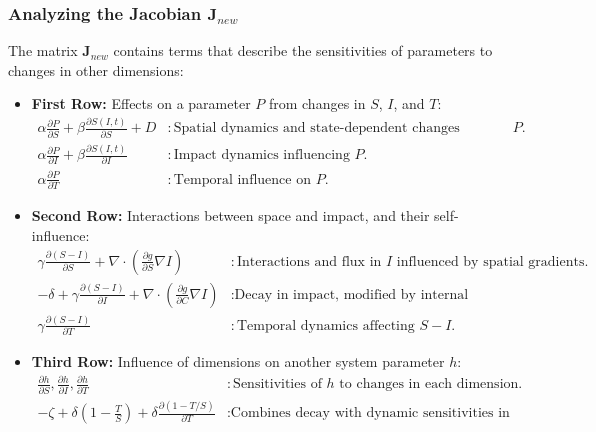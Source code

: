 \documentclass{article}
\begin{document}
\subsubsection*{Analyzing the Jacobian \(\mathbf{J}_{new}\)}
The matrix \(\mathbf{J}_{new}\) contains terms that describe the sensitivities of parameters to changes in other dimensions:
\begin{itemize}
    \item \textbf{First Row:} Effects on a parameter \(P\) from changes in \(S\), \(I\), and \(T\):
    \begin{align*}
        \alpha \frac{\partial P}{\partial S} + \beta \frac{\partial S(I, t)}{\partial S} + D & : \text{Spatial dynamics and state-dependent changes affecting } P. \\
        \alpha \frac{\partial P}{\partial I} + \beta \frac{\partial S(I, t)}{\partial I} & : \text{Impact dynamics influencing } P. \\
        \alpha \frac{\partial P}{\partial T} & : \text{Temporal influence on } P.
    \end{align*}
    
    \item \textbf{Second Row:} Interactions between space and impact, and their self-influence:
    \begin{align*}
        \gamma \frac{\partial (S - I)}{\partial S} + \nabla \cdot (\frac{\partial g}{\partial S} \nabla I) & : \text{Interactions and flux in } I \text{ influenced by spatial gradients.} \\
        -\delta + \gamma \frac{\partial (S - I)}{\partial I} + \nabla \cdot (\frac{\partial g}{\partial C} \nabla I) & : \text{Decay in impact, modified by internal dynamics.} \\
        \gamma \frac{\partial (S - I)}{\partial T} & : \text{Temporal dynamics affecting } S - I.
    \end{align*}
    
    \item \textbf{Third Row:} Influence of dimensions on another system parameter \(h\):
    \begin{align*}
        \frac{\partial h}{\partial S}, \frac{\partial h}{\partial I}, \frac{\partial h}{\partial T} & : \text{Sensitivities of } h \text{ to changes in each dimension.} \\
        -\zeta + \delta \left(1 - \frac{T}{S}\right) + \delta \frac{\partial (1 - T/S)}{\partial T} & : \text{Combines decay with dynamic sensitivities in time relative to space.}
    \end{align*}
\end{itemize}
\end{document}
